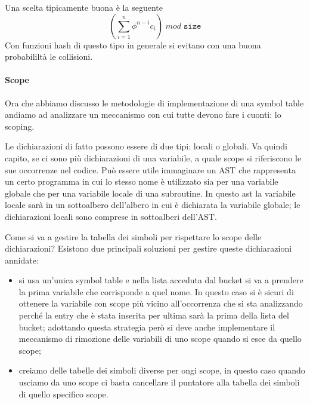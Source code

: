 \documentclass[class=book, crop=false, oneside, 12pt]{standalone}
\begin{document}
Una scelta tipicamente buona è la seguente
\begin{equation}
    (\sum_{i=1}^{n} \phi^{n-i}c_i) \; mod \; \texttt{size}
\end{equation}
Con funzioni hash di questo tipo in generale si evitano con una buona probabililtà le collisioni.

\paragraph{Scope} Ora che abbiamo discusso le metodologie di implementazione di una symbol table andiamo ad analizzare un meccanismo con cui tutte devono fare i cuonti: lo scoping.

Le dichiarazioni di fatto possono essere di due tipi: locali o globali.
Va quindi capito, se ci sono più dichiarazioni di una variabile, a quale scope si riferiscono le sue occorrenze nel codice.
Può essere utile immaginare un AST che rappresenta un certo programma in cui lo stesso nome è utilizzato sia per una variabile globale che per una variabile locale di una subroutine.
In questo ast la variabile locale sarà in un sottoalbero dell'albero in cui è dichiarata la variabile globale; le dichiarazioni locali sono comprese in sottoalberi dell'AST.

Come si va a gestire la tabella dei simboli per rispettare lo scope delle dichiarazioni?
\noindent
Esistono due principali soluzioni per gestire queste dichiarazioni annidate:
\begin{itemize}
    \item si usa un'unica symbol table e nella lista acceduta dal bucket si va a prendere la prima variabile che corrisponde a quel nome. In questo caso si è sicuri di ottenere la variabile con scope più vicino all'occorrenza che si sta analizzando perché la entry che è stata inserita per ultima sarà la prima della lista del bucket; adottando questa strategia però si deve anche implementare il meccanismo di rimozione delle variabili di uno scope quando si esce da quello scope;
    \item creiamo delle tabelle dei simboli diverse per ongi scope, in questo caso quando usciamo da uno scope ci basta cancellare il puntatore alla tabella dei simboli di quello specifico scope.
\end{itemize}
\end{document}
